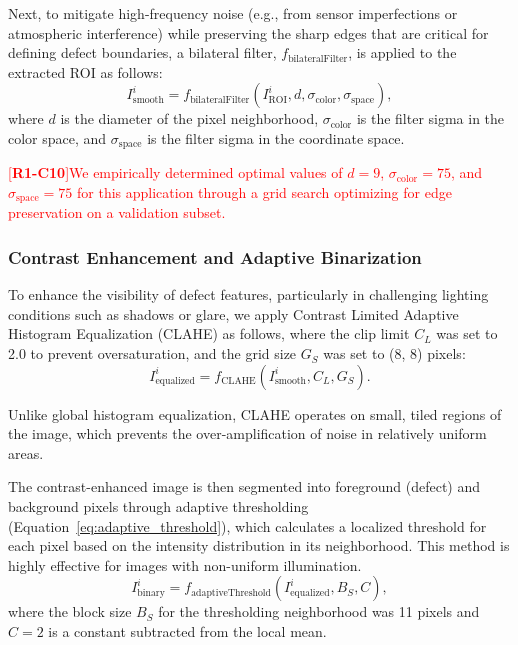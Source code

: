 \documentclass[energies,article,submit,pdftex,moreauthors]{Definitions/mdpi}
\newcommand{\revtag}[2]{[\textbf{R#1-C#2}]}
\newcommand{\Rone}[1]{\textcolor{red}{#1}}
\begin{document}
Next, to mitigate high-frequency noise (e.g., from sensor imperfections or atmospheric interference) while preserving the sharp edges that are critical for defining defect boundaries, a bilateral filter, \(f_{\text{bilateralFilter}}\), is applied to the extracted ROI as follows:
\begin{equation}
    I^i_{\text{smooth}} = f_{\text{bilateralFilter}}(I^i_{\text{ROI}}, d, \sigma_{\text{color}}, \sigma_{\text{space}}),
    \label{eq:bilateral_filter}
\end{equation}
where \(d\) is the diameter of the pixel neighborhood, \(\sigma_{\text{color}}\) is the filter sigma in the color space, and \(\sigma_{\text{space}}\) is the filter sigma in the coordinate space.

\Rone{\revtag{1}{10}We empirically determined optimal values of \(d=9\), \(\sigma_{\text{color}}=75\), and \(\sigma_{\text{space}}=75\) for this application through a grid search optimizing for edge preservation on a validation subset.}

\subsubsection{Contrast Enhancement and Adaptive Binarization}
To enhance the visibility of defect features, particularly in challenging lighting conditions such as shadows or glare, we apply Contrast Limited Adaptive Histogram Equalization (CLAHE) as follows, where the clip limit \(C_L\) was set to 2.0 to prevent oversaturation, and the grid size \(G_S\) was set to (8, 8) pixels:
\begin{equation}
    I^i_{\text{equalized}} = f_{\text{CLAHE}}(I^i_{\text{smooth}}, C_L, G_S).
    \label{eq:clahe}
\end{equation}

Unlike global histogram equalization, CLAHE operates on small, tiled regions of the image, which prevents the over-amplification of noise in relatively uniform areas.

The contrast-enhanced image is then segmented into foreground (defect) and background pixels through adaptive thresholding (Equation~\ref{eq:adaptive_threshold}), which calculates a localized threshold for each pixel based on the intensity distribution in its neighborhood. This method is highly effective for images with non-uniform illumination.
\begin{equation}
    I^i_{\text{binary}} = f_{\text{adaptiveThreshold}}(I^i_{\text{equalized}}, B_S, C),
    \label{eq:adaptive_threshold}
\end{equation}
where the block size \(B_S\) for the thresholding neighborhood was 11 pixels and \(C=2\) is a constant subtracted from the local mean.
\end{document}
